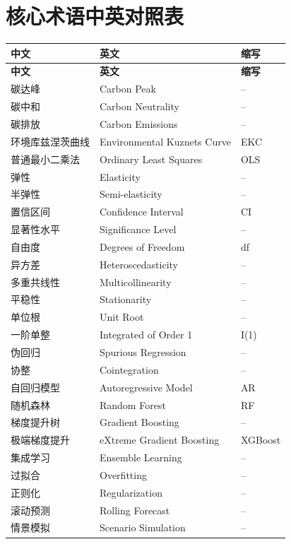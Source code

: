 \documentclass[12pt, a4paper]{article}
\begin{document}
\newpage
\section{核心术语中英对照表}

\begin{longtable}{lll}
\toprule
\textbf{中文} & \textbf{英文} & \textbf{缩写} \\
\midrule
\endfirsthead
\toprule
\textbf{中文} & \textbf{英文} & \textbf{缩写} \\
\midrule
\endhead
\bottomrule
\endfoot

碳达峰 & Carbon Peak & -- \\
碳中和 & Carbon Neutrality & -- \\
碳排放 & Carbon Emissions & -- \\
环境库兹涅茨曲线 & Environmental Kuznets Curve & EKC \\
普通最小二乘法 & Ordinary Least Squares & OLS \\
弹性 & Elasticity & -- \\
半弹性 & Semi-elasticity & -- \\
置信区间 & Confidence Interval & CI \\
显著性水平 & Significance Level & -- \\
自由度 & Degrees of Freedom & df \\
异方差 & Heteroscedasticity & -- \\
多重共线性 & Multicollinearity & -- \\
平稳性 & Stationarity & -- \\
单位根 & Unit Root & -- \\
一阶单整 & Integrated of Order 1 & I(1) \\
伪回归 & Spurious Regression & -- \\
协整 & Cointegration & -- \\
自回归模型 & Autoregressive Model & AR \\
随机森林 & Random Forest & RF \\
梯度提升树 & Gradient Boosting & -- \\
极端梯度提升 & eXtreme Gradient Boosting & XGBoost \\
集成学习 & Ensemble Learning & -- \\
过拟合 & Overfitting & -- \\
正则化 & Regularization & -- \\
滚动预测 & Rolling Forecast & -- \\
情景模拟 & Scenario Simulation & -- \\

\end{longtable}
\end{document}
